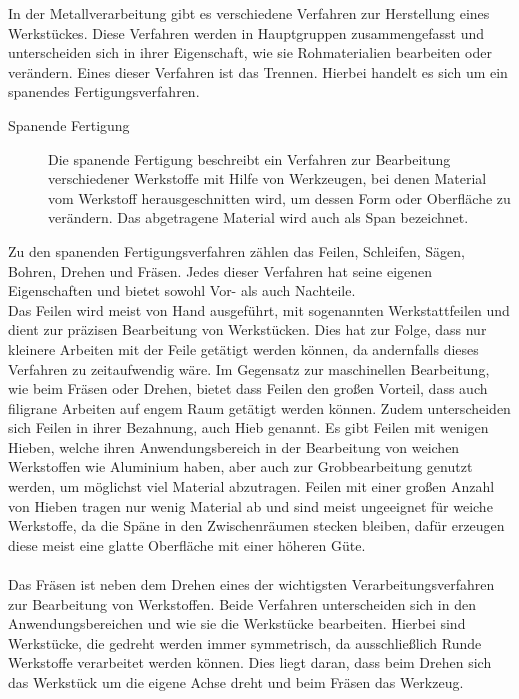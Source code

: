 In der Metallverarbeitung gibt es verschiedene Verfahren zur Herstellung eines Werkstückes. Diese Verfahren werden in Hauptgruppen zusammengefasst und 
unterscheiden sich in ihrer Eigenschaft, wie sie Rohmaterialien bearbeiten oder verändern. Eines dieser Verfahren ist das Trennen. Hierbei handelt es sich 
um ein spanendes Fertigungsverfahren.
\begin{description}
\item[Spanende Fertigung] Die spanende Fertigung beschreibt ein Verfahren zur Bearbeitung verschiedener Werkstoffe mit Hilfe von Werkzeugen, bei denen 
Material vom Werkstoff herausgeschnitten wird, um dessen Form oder Oberfläche zu verändern. Das abgetragene Material wird auch als Span bezeichnet.\autocite{Dietrich.2020}
\end{description}
Zu den spanenden Fertigungsverfahren zählen \zB das Feilen, Schleifen, Sägen, Bohren, Drehen und Fräsen. Jedes dieser Verfahren hat seine eigenen 
Eigenschaften und bietet sowohl Vor- als auch Nachteile. 
\\
Das Feilen wird meist von Hand ausgeführt, mit sogenannten Werkstattfeilen und dient zur präzisen Bearbeitung von Werkstücken. Dies hat zur Folge, dass nur 
kleinere Arbeiten mit der Feile getätigt werden können, da andernfalls dieses Verfahren zu zeitaufwendig wäre. Im Gegensatz zur maschinellen Bearbeitung, 
wie \zB beim Fräsen oder Drehen, bietet dass Feilen den großen Vorteil, dass auch filigrane Arbeiten auf engem Raum getätigt werden können. Zudem 
unterscheiden sich Feilen in ihrer Bezahnung, auch Hieb genannt. Es gibt Feilen mit wenigen Hieben, welche ihren Anwendungsbereich in der Bearbeitung 
von weichen Werkstoffen wie Aluminium haben, aber auch zur Grobbearbeitung genutzt werden, um möglichst viel Material abzutragen. Feilen mit einer großen 
Anzahl von Hieben tragen nur wenig Material ab und sind meist ungeeignet für weiche Werkstoffe, da die Späne in den Zwischenräumen stecken bleiben, dafür 
erzeugen diese meist eine glatte Oberfläche mit einer höheren Güte. \autocite{Forster.2018}
\\\\
Das Fräsen ist neben dem Drehen eines der wichtigsten Verarbeitungsverfahren zur Bearbeitung von Werkstoffen. Beide Verfahren unterscheiden sich in den 
Anwendungsbereichen und wie sie die Werkstücke bearbeiten. Hierbei sind Werkstücke, die gedreht werden immer symmetrisch, da ausschließlich Runde 
Werkstoffe verarbeitet werden können. Dies liegt daran, dass beim Drehen sich das Werkstück um die eigene Achse dreht und beim Fräsen das Werkzeug. 
